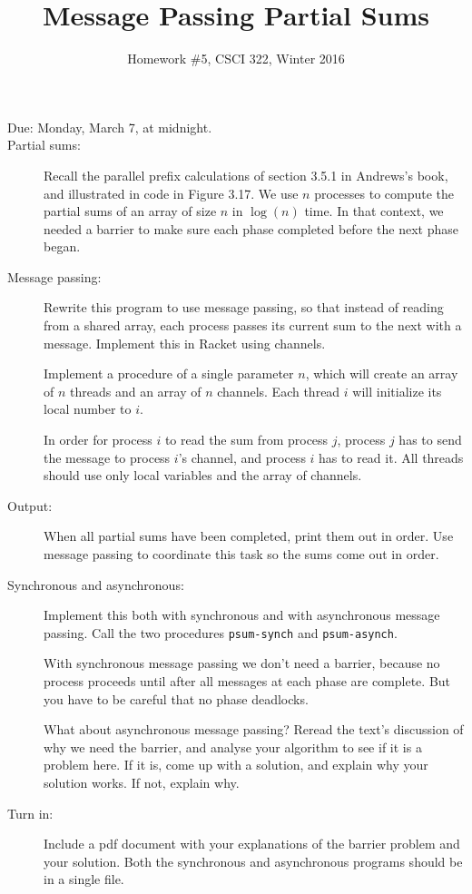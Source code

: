 \documentclass{article}
\title{Message Passing Partial Sums}
\author{Homework \#5, CSCI 322, Winter 2016}
\date{}
\begin{document}
\maketitle

\begin{description}

\item[Due:  Monday, March 7, at  midnight.]

\item[Partial sums:] Recall the parallel prefix calculations of
  section 3.5.1 in Andrews's book, and illustrated in code in Figure
  3.17.   We use $n$ processes to compute the partial sums of an array
  of size $n$ in $\log(n)$ time.
  In that context, we needed a barrier to make sure each phase
  completed before the next phase began.

\item[Message passing:]
  Rewrite this program to use message passing, so that instead of
  reading from a shared array, each process passes its current sum to
  the next with a message.  Implement this in Racket using channels.

  Implement a procedure of a single parameter $n$, which will create
  an array of $n$ threads and an array of $n$ channels.  Each thread
  $i$ will initialize its local number to $i$.

  In order for
  process $i$ to read the sum from process $j$, process $j$ has to
  send the message to process $i$'s channel, and process $i$ has to
  read it.  All threads should use only local variables and the
  array of channels. 

\item[Output:]  When all partial sums have been completed, print them
  out in order.  Use message passing to coordinate this task so the
  sums come out in order.

\item[Synchronous and asynchronous:] Implement this both with
  synchronous and with asynchronous message passing.  Call the two
  procedures {\tt psum-synch} and {\tt psum-asynch}.
  
  With synchronous message passing we don't need a barrier, because no
  process proceeds until after all messages at each phase are
  complete.  But you have to be careful that no phase deadlocks.

  What about asynchronous message passing?  Reread the text's
  discussion of why we need the barrier, and analyse your algorithm to
  see if it is a problem here.  If it is, come up with a solution, and
  explain why your solution works.  If not, explain why.

\item[Turn in:] Include a pdf document with your explanations of the
  barrier problem and your solution.  Both the synchronous and
  asynchronous programs should be in a single file.
\end{description}
\end{document}
